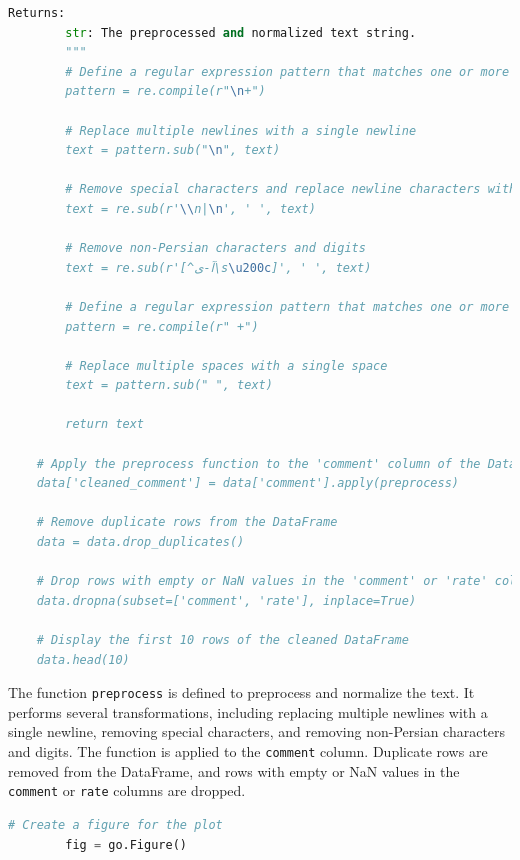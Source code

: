 \documentclass{solutionclass} %
\begin{document}
\begin{solution}
\begin{lstlisting}[language=Python, basicstyle=\ttfamily\footnotesize, keywordstyle=\color{blue}, commentstyle=\color{gray}]
        Returns:
        str: The preprocessed and normalized text string.
        """
        # Define a regular expression pattern that matches one or more newline characters
        pattern = re.compile(r"\n+")
        
        # Replace multiple newlines with a single newline
        text = pattern.sub("\n", text)
        
        # Remove special characters and replace newline characters with spaces
        text = re.sub(r'\\n|\n', ' ', text)
        
        # Remove non-Persian characters and digits
        text = re.sub(r'[^آ-ی\s\u200c]', ' ', text)
        
        # Define a regular expression pattern that matches one or more spaces
        pattern = re.compile(r" +")
        
        # Replace multiple spaces with a single space
        text = pattern.sub(" ", text)
        
        return text
    
    # Apply the preprocess function to the 'comment' column of the DataFrame
    data['cleaned_comment'] = data['comment'].apply(preprocess)
    
    # Remove duplicate rows from the DataFrame
    data = data.drop_duplicates()
    
    # Drop rows with empty or NaN values in the 'comment' or 'rate' columns
    data.dropna(subset=['comment', 'rate'], inplace=True)
    
    # Display the first 10 rows of the cleaned DataFrame
    data.head(10)
    \end{lstlisting}
    
    The function \texttt{preprocess} is defined to preprocess and normalize the text. It performs several transformations, including replacing multiple newlines with a single newline, removing special characters, and removing non-Persian characters and digits. The function is applied to the \texttt{comment} column. Duplicate rows are removed from the DataFrame, and rows with empty or NaN values in the \texttt{comment} or \texttt{rate} columns are dropped.

    

    \begin{lstlisting}[language=Python, basicstyle=\ttfamily\footnotesize, keywordstyle=\color{blue}, commentstyle=\color{gray}]
        # Create a figure for the plot
        fig = go.Figure()
        

\end{lstlisting}
\end{solution}
\end{document}

